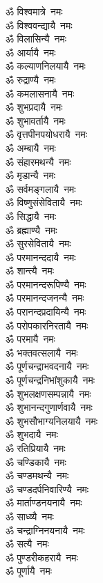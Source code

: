 \begin{multicols}{2}
\begin{flushleft}
ॐ विश्वमात्रे~नमः\\
ॐ विश्ववन्द्यायै~नमः\\
ॐ विलासिन्यै~नमः\\
ॐ आर्यायै~नमः\\
ॐ कल्याणनिलयायै~नमः\\
ॐ रुद्राण्यै~नमः\\
ॐ कमलासनायै~नमः\\
ॐ शुभप्रदायै~नमः\\
ॐ शुभावर्तायै~नमः\\
ॐ वृत्तपीनपयोधरायै~नमः\hfill{}\\
ॐ अम्बायै~नमः\\
ॐ संहारमथन्यै~नमः\\
ॐ मृडान्यै~नमः\\
ॐ सर्वमङ्गलायै~नमः\\
ॐ विष्णुसंसेवितायै~नमः\\
ॐ सिद्धायै~नमः\\
ॐ ब्रह्माण्यै~नमः\\
ॐ सुरसेवितायै~नमः\\
ॐ परमानन्ददायै~नमः\\
ॐ शान्त्यै~नमः\hfill{}\\
ॐ परमानन्दरूपिण्यै~नमः\\
ॐ परमानन्दजनन्यै~नमः\\
ॐ परानन्दप्रदायिन्यै~नमः\\
ॐ परोपकारनिरतायै~नमः\\
ॐ परमायै~नमः\\
ॐ भक्तवत्सलायै~नमः\\
ॐ पूर्णचन्द्राभवदनायै~नमः\\
ॐ पूर्णचन्द्रनिभांशुकायै~नमः\\
ॐ शुभलक्षणसम्पन्नायै~नमः\\
ॐ शुभानन्दगुणार्णवायै~नमः\hfill{}\\
ॐ शुभसौभाग्यनिलयायै~नमः\\
ॐ शुभदायै~नमः\\
ॐ रतिप्रियायै~नमः\\
ॐ चण्डिकायै~नमः\\
ॐ चण्डमथन्यै~नमः\\
ॐ चण्डदर्पनिवारिण्यै~नमः\\
ॐ मार्ताण्डनयनायै~नमः\\
ॐ साध्व्यै~नमः\\
ॐ चन्द्राग्निनयनायै~नमः\\
ॐ सत्यै~नमः\hfill{}\\
ॐ पुण्डरीकहरायै~नमः\\
ॐ पूर्णायै~नमः\\

\end{flushleft}
\end{multicols}
